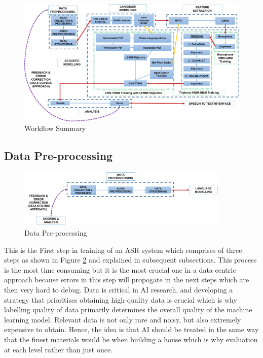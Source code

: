 \documentclass[lettersize,journal]{IEEEtran}
\begin{document}
\begin{figure}[h]
    \centering
    \includegraphics[width=1.0\textwidth]{img/workflow.png}
    \caption{Workflow Summary}
    \label{fig:workflow}
\end{figure}

\subsection{Data Pre-processing}

\begin{figure}[h]
    \centering
    \includegraphics[width=0.9\textwidth]{img/workflow-1.png}
    \caption{Data Pre-processing}
    \label{fig:working_pipeline-1}
\end{figure}

This is the First step in training of an ASR system which comprises of three steps as shown in Figure \ref{fig:working_pipeline-1} and explained in subsequent subsections. This process is the most time consuming but it is the most crucial one in a data-centric approach because errors in this step will propogate in the next steps which are then very hard to debug. Data is critical in AI research, and developing a strategy that prioritises obtaining high-quality data is crucial which is why labelling quality of data primarily determines the overall quality of the machine learning model. Relevant data is not only rare and noisy, but also extremely expensive to obtain. Hence, the idea is that AI should be treated in the same way that the finest materials would be when building a house which is why evaluation at each level rather than just once. 
\end{document}
